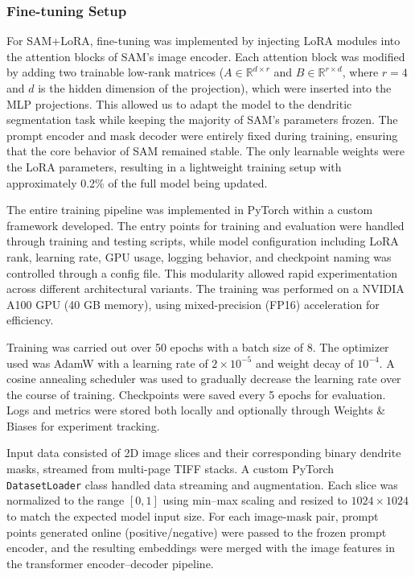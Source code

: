 \subsubsection{\textbf{Fine-tuning Setup}}
For \gls{SAM}+\gls{LoRA}, fine-tuning was implemented by injecting \gls{LoRA} modules into the attention blocks of \gls{SAM}’s image encoder. Each attention block was modified by adding two trainable low-rank matrices ($A \in \mathbb{R}^{d \times r}$ and $B \in \mathbb{R}^{r \times d}$, where $r = 4$ and $d$ is the hidden dimension of the projection), which were inserted into the \gls{MLP} projections. This allowed us to adapt the model to the dendritic segmentation task while keeping the majority of \gls{SAM}’s parameters frozen. The prompt encoder and mask decoder were entirely fixed during training, ensuring that the core behavior of \gls{SAM} remained stable. The only learnable weights were the \gls{LoRA} parameters, resulting in a lightweight training setup with approximately 0.2\% of the full model being updated.

The entire training pipeline was implemented in PyTorch within a custom framework developed. The entry points for training and evaluation were handled through training and testing scripts, while model configuration including \gls{LoRA} rank, learning rate, \gls{GPU} usage, logging behavior, and checkpoint naming was controlled through a config file. This modularity allowed rapid experimentation across different architectural variants. The training was performed on a NVIDIA A100 \gls{GPU} (40 GB memory), using mixed-precision (FP16) acceleration for efficiency.

Training was carried out over 50 epochs with a batch size of 8. The optimizer used was AdamW with a learning rate of $2 \times 10^{-5}$ and weight decay of $10^{-4}$. A cosine annealing scheduler was used to gradually decrease the learning rate over the course of training. Checkpoints were saved every 5 epochs for evaluation. Logs and metrics were stored both locally and optionally through Weights \& Biases for experiment tracking.

Input data consisted of 2D image slices and their corresponding binary dendrite masks, streamed from multi-page \gls{TIFF} stacks. A custom PyTorch \texttt{DatasetLoader} class handled data streaming and augmentation. Each slice was normalized to the range $[0,1]$ using min–max scaling and resized to $1024 \times 1024$ to match the expected model input size. For each image-mask pair, prompt points generated online (positive/negative) were passed to the frozen prompt encoder, and the resulting embeddings were merged with the image features in the transformer encoder–decoder pipeline.

